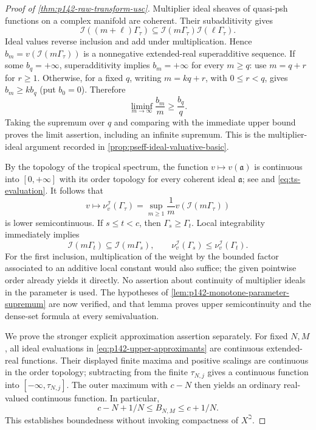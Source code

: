 \begin{proof}[Proof of \cref{thm:p142-raw-transform-usc}]
Multiplier ideal sheaves of quasi-psh functions on a complex manifold
are coherent. Their subadditivity \cite[Theorem~2.6(ii)]{DEL00} gives
\[
 \mathcal I((m+\ell)\Gamma_\tau)
 \subseteq\mathcal I(m\Gamma_\tau)
               \mathcal I(\ell\Gamma_\tau).
\]
Ideal values reverse inclusion and add under multiplication. Hence
$b_m=v(\mathcal I(m\Gamma_\tau))$ is a nonnegative extended-real
superadditive sequence. If some $b_q=+\infty$, superadditivity implies
$b_m=+\infty$ for every $m\geq q$: use $m=q+r$ for $r\geq1$.
Otherwise, for a fixed $q$, writing $m=kq+r$, with $0\leq r<q$, gives
$b_m\geq kb_q$ (put $b_0=0$). Therefore
\[
 \liminf_{m\to\infty}\frac{b_m}{m}\geq\frac{b_q}{q}.
\]
Taking the supremum over $q$ and comparing with the immediate upper
bound proves the limit assertion, including an infinite supremum. This
is the multiplier-ideal argument recorded in
\cref{prop:pseff-ideal-valuative-basic}.

By the topology of the tropical spectrum, the function
$v\mapsto v(\mathfrak a)$ is continuous into $[0,+\infty]$ with its
order topology for every coherent ideal $\mathfrak a$; see
\cite[Definition~1.3.1]{MP24} and \eqref{eq:ts-evaluation}.
It follows that
\[
 v\longmapsto\nu_v^{\mathcal I}(\Gamma_\tau)
   =\sup_{m\geq1}\frac1m
          v(\mathcal I(m\Gamma_\tau))
\]
is lower semicontinuous. If $s\leq t<c$, then
$\Gamma_s\geq\Gamma_t$. Local integrability immediately implies
\[
 \mathcal I(m\Gamma_t)\subseteq\mathcal I(m\Gamma_s),
 \qquad
 \nu_v^{\mathcal I}(\Gamma_s)
       \leq\nu_v^{\mathcal I}(\Gamma_t).
\]
For the first inclusion, multiplication of the weight by the bounded
factor associated to an additive local constant would also suffice;
the given pointwise order already yields it directly. No assertion
about continuity of multiplier ideals in the parameter is used.
The hypotheses of \cref{lem:p142-monotone-parameter-supremum} are now
verified, and that lemma proves upper semicontinuity and the dense-set
formula at every semivaluation.

We prove the stronger explicit approximation assertion separately.
For fixed $N,M$, all ideal evaluations in
\eqref{eq:p142-upper-approximants} are continuous extended-real
functions. Their displayed finite maxima and positive scalings are
continuous in the order topology; subtracting from the finite
$\tau_{N,j}$ gives a continuous function into $[-\infty,\tau_{N,j}]$.
The outer maximum with $c-N$ then yields an ordinary real-valued
continuous function. In particular,
\[
        c-N+1/N\leq B_{N,M}\leq c+1/N.
\]
This establishes boundedness without invoking compactness of $X^\beth$.


\end{proof}
